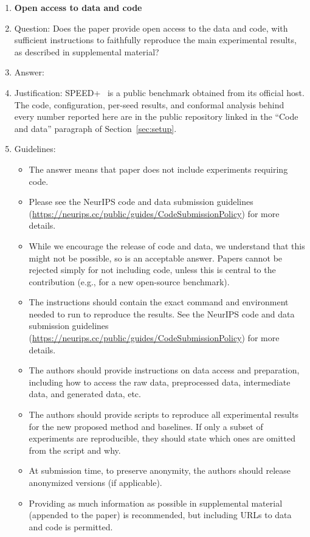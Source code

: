 \begin{enumerate}
\item {\bf Open access to data and code}
    \item[] Question: Does the paper provide open access to the data and code, with sufficient instructions to faithfully reproduce the main experimental results, as described in supplemental material?
    \item[] Answer: \answerYes{}
    \item[] Justification: SPEED+~\citep{park2022speedplus} is a public benchmark obtained from its official host.
    The code, configuration, per-seed results, and conformal analysis behind every number
    reported here are in the public repository linked in the ``Code and data''
    paragraph of Section~\ref{sec:setup}.
    \item[] Guidelines:
    \begin{itemize}
        \item The answer \answerNA{} means that paper does not include experiments requiring code.
        \item Please see the NeurIPS code and data submission guidelines (\url{https://neurips.cc/public/guides/CodeSubmissionPolicy}) for more details.
        \item While we encourage the release of code and data, we understand that this might not be possible, so \answerNo{} is an acceptable answer. Papers cannot be rejected simply for not including code, unless this is central to the contribution (e.g., for a new open-source benchmark).
        \item The instructions should contain the exact command and environment needed to run to reproduce the results. See the NeurIPS code and data submission guidelines (\url{https://neurips.cc/public/guides/CodeSubmissionPolicy}) for more details.
        \item The authors should provide instructions on data access and preparation, including how to access the raw data, preprocessed data, intermediate data, and generated data, etc.
        \item The authors should provide scripts to reproduce all experimental results for the new proposed method and baselines. If only a subset of experiments are reproducible, they should state which ones are omitted from the script and why.
        \item At submission time, to preserve anonymity, the authors should release anonymized versions (if applicable).
        \item Providing as much information as possible in supplemental material (appended to the paper) is recommended, but including URLs to data and code is permitted.
    \end{itemize}



\end{enumerate}

